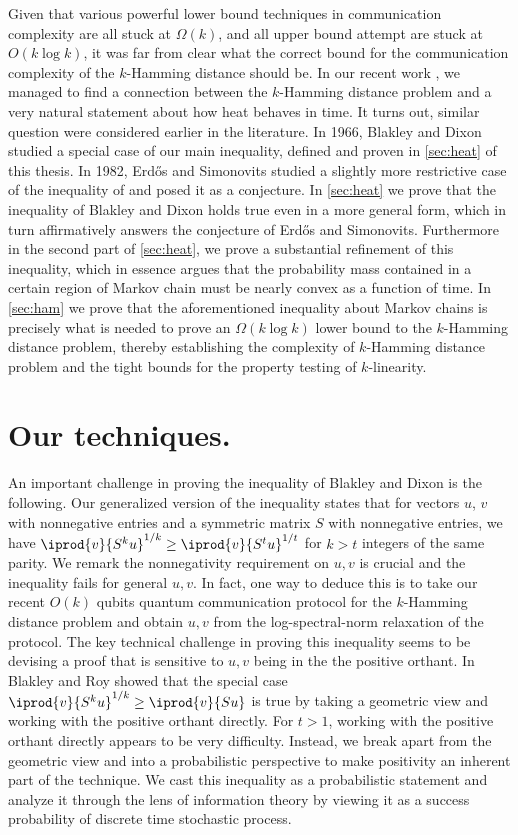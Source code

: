 Given that various powerful lower bound techniques in communication complexity are all stuck at $\Omega(k)$, 
and all upper bound attempt are stuck at $O(k\log k)$,
it was far from clear what the correct bound for the communication complexity of the $k$-Hamming distance should be.
In our recent work \cite{Saglam2018}, we managed to find a connection between the $k$-Hamming distance problem and a 
very natural statement 
about how heat behaves in time. It turns out, similar question were considered earlier in the literature.
In 1966, Blakley and Dixon \cite{BlakleyD1966} studied a special case of  our main inequality, defined and proven in \autoref{sec:heat} of this thesis.
In 1982, Erdős and Simonovits \cite{ErdosS1982}
studied a slightly more restrictive case of the inequality of \cite{BlakleyD1966} and posed it as a conjecture. 
In \autoref{sec:heat} we prove that the inequality of Blakley and Dixon holds true even in a more general form, which in turn affirmatively answers the conjecture of Erdős and Simonovits. Furthermore in the second part of \autoref{sec:heat}, we prove a substantial refinement of this inequality, which in essence argues that the probability mass contained in a certain region of Markov chain must be nearly convex
as a function of time. In \autoref{sec:ham} we prove that the aforementioned inequality about Markov chains is precisely what is needed
to prove an $\Omega(k\log k)$ lower bound to the $k$-Hamming distance problem, thereby establishing the complexity of 
$k$-Hamming distance problem and the tight bounds for the property testing of $k$-linearity.

\section{Our techniques.}
\label{sec:intro:tech}

An important challenge in proving the inequality of Blakley and Dixon \cite{BlakleyD1966} is the following.
Our generalized version of the inequality states that for vectors $u$, $v$ with nonnegative entries and a symmetric matrix $S$ with nonnegative entries,
we have $\iprod{v}{S^{k}u}^{1/k}\ge\iprod{v}{S^{t}u}^{1/t}$ for $k>t$ integers of the same parity. We remark the nonnegativity requirement on $u,v$ is crucial
and the inequality fails for general $u,v$. In fact, one way to deduce this is to take our recent $O(k)$ qubits quantum communication protocol for the $k$-Hamming distance problem and obtain $u,v$ from the log-spectral-norm relaxation of the protocol. 
The key technical challenge in proving this inequality seems to be devising a proof that is sensitive to $u,v$ being in the the positive orthant.
In \cite{BlakleyR1965} Blakley and Roy showed that the special case $\iprod{v}{S^{k}u}^{1/k} \ge \iprod{v}{Su}$ is true by taking a geometric view and working with the positive orthant directly. For $t>1$, working with the positive orthant directly appears to be very difficulty. 
Instead, we break apart from the geometric view and into a probabilistic perspective to make positivity an inherent part of the technique.
We cast this inequality as a probabilistic statement and analyze it through the lens of information theory by viewing it as a success probability of discrete time stochastic process.

